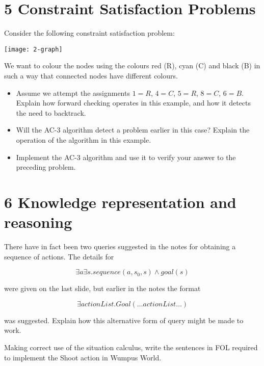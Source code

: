 \documentclass{supervision}
\begin{document}
  \begin{questions}
    \section*{5 Constraint Satisfaction Problems}
    \question Consider the following constraint satisfaction problem:

      \begin{center}
        \texttt{[image: 2-graph]}
      \end{center}

      We want to colour the nodes using the colours red (R), cyan (C) and black
      (B) in such a way that connected nodes have different colours.

      \begin{itemize}
        \item Assume we attempt the assignments $1 = R$, $4 = C$, $5 = R$, $8 =
          C$, $6 = B$. Explain how forward checking operates in this example,
          and how it detects the need to backtrack.

        \item Will the AC-3 algorithm detect a problem earlier in this case?
          Explain the operation of the algorithm in this example.

        \item Implement the AC-3 algorithm and use it to verify your answer to
          the preceding problem.
      \end{itemize}

    \section*{6 Knowledge representation and reasoning}
    \question There have in fact been two queries suggested in the notes for
      obtaining a sequence of actions. The details for

      \begin{equation*}
        \exists a \exists s. {sequence}(a, s_0, s) \land {goal}(s)
      \end{equation*}

      were given on the last slide, but earlier in the notes the format

      \begin{equation*}
        \exists {actionList}.{Goal}(\ldots {actionList} \ldots)
      \end{equation*}

      was suggested. Explain how this alternative form of query might be made to
      work.

    \question Making correct use of the situation calculus, write the sentences
      in FOL required to implement the Shoot action in Wumpus World.

  \end{questions}
\end{document}
